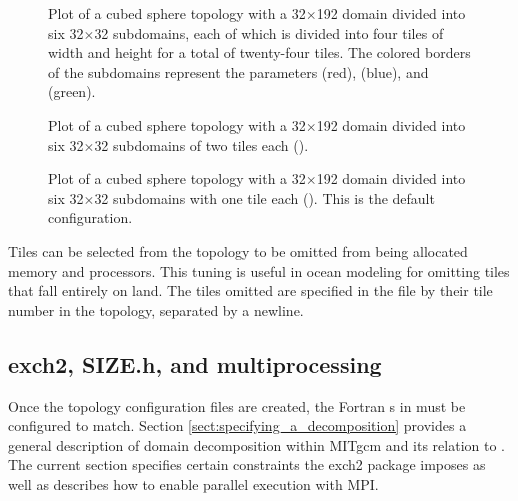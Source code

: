 \begin{figure}
\begin{center}
\end{center} 

\caption{Plot of a cubed sphere topology with a 32$\times$192 domain
divided into six 32$\times$32 subdomains, each of which is divided
into four tiles of width  and height  for a 
total of twenty-four tiles.  The colored borders of the subdomains 
represent the parameters  (red),  (blue), and 
 (green).  } \label{fig:24tile}
\end{figure}

\begin{figure}
\begin{center}
\end{center} 
\caption{Plot of a cubed sphere topology with a 32$\times$192 domain
divided into six 32$\times$32 subdomains of two tiles each
 ().
} \label{fig:12tile}
\end{figure}

\begin{figure}
\begin{center}
\end{center} 
\caption{Plot of a cubed sphere topology with a 32$\times$192 domain
divided into six 32$\times$32 subdomains with one tile each
().  This is the default configuration.
  }
\label{fig:6tile}
\end{figure}


Tiles can be selected from the topology to be omitted from being
allocated memory and processors.  This tuning is useful in ocean
modeling for omitting tiles that fall entirely on land.  The tiles
omitted are specified in the file
by their tile number in the topology, separated by a newline. \\




\subsection{exch2, SIZE.h, and multiprocessing}
\label{sec:exch2mpi}

Once the topology configuration files are created, the Fortran
s in  must be configured to match.
Section \ref{sect:specifying_a_decomposition}  provides a general description of domain
decomposition within MITgcm and its relation to . The
current section specifies certain constraints the exch2 package
imposes as well as describes how to enable parallel execution with
MPI. \\

